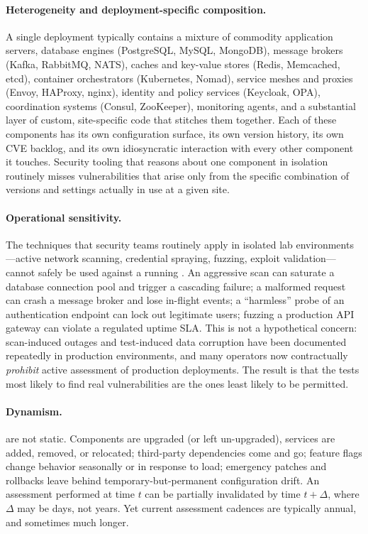 \paragraph{Heterogeneity and deployment-specific composition.}
A single \cps deployment typically contains a mixture of commodity
application servers, database engines (PostgreSQL, MySQL, MongoDB),
message brokers (Kafka, RabbitMQ, NATS), caches and key-value stores
(Redis, Memcached, etcd), container orchestrators (Kubernetes,
Nomad), service meshes and proxies (Envoy, HAProxy, nginx), identity
and policy services (Keycloak, OPA), coordination systems (Consul,
ZooKeeper), monitoring agents, and a substantial layer of custom,
site-specific code that stitches them together. Each of these
components has its own configuration surface, its own version
history, its own CVE backlog, and its own idiosyncratic interaction
with every other component it touches. Security tooling that
reasons about one component in isolation routinely misses
vulnerabilities that arise only from the specific combination of
versions and settings actually in use at a given site.

\paragraph{Operational sensitivity.}
The techniques that security teams routinely apply in isolated lab
environments---active network scanning, credential spraying, fuzzing,
exploit validation---cannot safely be used against a running \cps. An
aggressive scan can saturate a database connection pool and trigger
a cascading failure; a malformed request can crash a message broker
and lose in-flight events; a ``harmless'' probe of an authentication
endpoint can lock out legitimate users; fuzzing a production API
gateway can violate a regulated uptime SLA. This is not a hypothetical
concern: scan-induced outages and test-induced data corruption have
been documented repeatedly in production environments, and many
operators now contractually \emph{prohibit} active assessment of
production deployments. The result
is that the tests most likely to find real vulnerabilities are the ones
least likely to be permitted.

\paragraph{Dynamism.}
\CPSs are not static. Components are upgraded (or left un-upgraded),
services are added, removed, or relocated; third-party dependencies
come and go; feature flags change behavior seasonally or in response
to load; emergency patches and rollbacks leave behind
temporary-but-permanent configuration drift. An
assessment performed at time $t$ can be partially invalidated by time
$t + \Delta$, where $\Delta$ may be days, not years. Yet current
assessment cadences are typically annual, and sometimes much longer.

